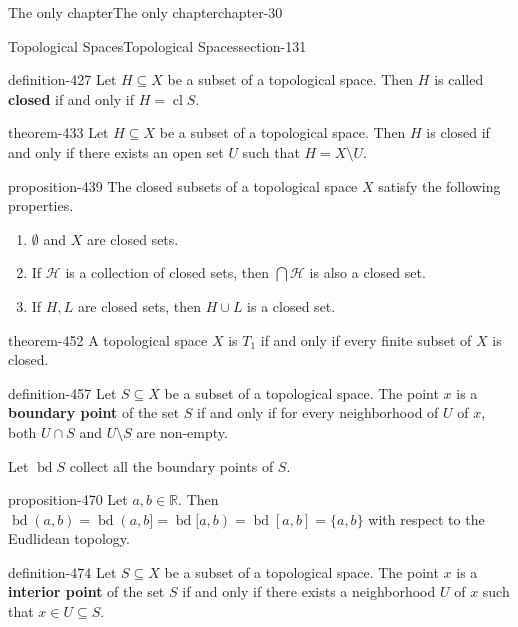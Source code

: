 \documentclass[oneside,10pt,]{book}
\newcommand{\terminology}[1]{\textbf{#1}}
\newcommand{\mb}{\mathbb}
\newcommand{\mc}{\mathcal}
\newcommand{\cl}{\operatorname{cl}}
\newcommand{\bd}{\operatorname{bd}}
\begin{document}
\begin{chapterptx}{The only chapter}{}{The only chapter}{}{}{chapter-30}
\begin{sectionptx}{Topological Spaces}{}{Topological Spaces}{}{}{section-131}
\begin{definition}{}{definition-427}
\hypertarget{p-428}{}%
Let \(H\subseteq X\) be a subset of a topological space. Then \(H\) is called \terminology{closed} if and only if \(H=\cl S\).%
\end{definition}
\begin{theorem}{}{}{theorem-433}%
\hypertarget{p-434}{}%
Let \(H\subseteq X\) be a subset of a topological space. Then \(H\) is closed if and only if there exists an open set \(U\) such that \(H=X\setminus U\).%
\end{theorem}
\begin{proposition}{}{}{proposition-439}%
\hypertarget{p-440}{}%
The closed subsets of a topological space \(X\) satisfy the following properties.%
\leavevmode%
\begin{enumerate}
\item\hypertarget{li-443}{}\(\emptyset\) and \(X\) are closed sets.%
\item\hypertarget{li-446}{}If \(\mc H\) is a collection of closed sets, then \(\bigcap\mc H\) is also a closed set.%
\item\hypertarget{li-449}{}If \(H,L\) are closed sets, then \(H\cup L\) is a closed set.%
\end{enumerate}
\end{proposition}
\begin{theorem}{}{}{theorem-452}%
\hypertarget{p-453}{}%
A topological space \(X\) is \(T_1\) if and only if every finite subset of \(X\) is closed.%
\end{theorem}
\begin{definition}{}{definition-457}%
\hypertarget{p-458}{}%
Let \(S\subseteq X\) be a subset of a topological space. The point \(x\) is a \terminology{boundary point} of the set \(S\) if and only if for every neighborhood of \(U\) of \(x\), both \(U\cap S\) and \(U\setminus S\) are non-empty.%
\par
\hypertarget{p-467}{}%
Let \(\bd S\) collect all the boundary points of \(S\).%
\end{definition}
\begin{proposition}{}{}{proposition-470}%
\hypertarget{p-471}{}%
Let \(a,b\in\mb R\). Then \(\bd (a,b)=\bd (a,b]=\bd [a,b)=\bd [a,b]=\{a,b\}\) with respect to the Eudlidean topology.%
\end{proposition}
\begin{definition}{}{definition-474}%
\hypertarget{p-475}{}%
Let \(S\subseteq X\) be a subset of a topological space. The point \(x\) is a \terminology{interior point} of the set \(S\) if and only if there exists a neighborhood \(U\) of \(x\) such that \(x\in U\subseteq S\).%

\end{definition}
\end{sectionptx}
\end{chapterptx}
\end{document}
